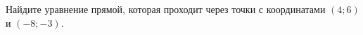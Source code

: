 \begin{ex}
	\begin{condition}
		Найдите уравнение прямой, которая проходит через точки с координатами \( (4;6) \) и \( (-8;-3) \).
	\end{condition}
\end{ex}